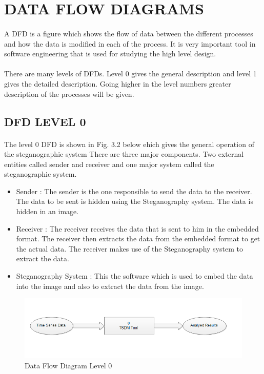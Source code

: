 \documentclass[12pt]{report}
\begin{document}
\section{DATA FLOW DIAGRAMS}
\paragraph{}A DFD is a figure which shows the flow of data between the different processes and how the data is modified in each of the process. It is very important tool in software engineering that is used for studying the high level design.\\
\paragraph{}There are many levels of DFDs. Level 0 gives the general description and level 1 gives the detailed description. Going higher in the level numbers greater description of the processes will be given.
\pagebreak
\subsection{DFD LEVEL 0}
\paragraph{}The level 0 DFD is shown in Fig. 3.2 below ehich gives the general operation of the steganographic system There are three major components. Two external entities called sender and receiver and one major system called the steganographic system.
\begin{itemize}
\item Sender : The sender is the one responsible to send the data to the receiver. The data to be sent is hidden using the Steganography system. The data is hidden in an image.
\item Receiver : The receiver receives the data that is sent to him in the embedded format. The receiver then extracts the data from the embedded format to get the actual data. The receiver makes use of the Steganography system to extract the data.
\item Steganography System : This the software which is used to embed the data into the image and also to extract the data from the image.
\end{itemize}
\begin{figure}[h!]
	\centering
		\includegraphics[scale=0.8]{screenshots/dfd_0.png}
		\caption{Data Flow Diagram Level 0}
\end{figure} 
\pagebreak
\end{document}
